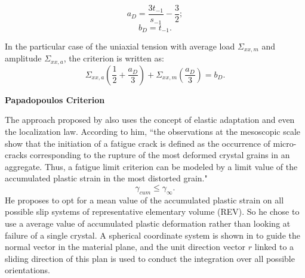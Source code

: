 $$a_D=\frac{3t_{-1}}{s_{-1}}-\frac{3}{2};$$  $$b_D=t_{-1}.$$

In the particular case of the uniaxial tension with average load $\Sigma_{xx,m}$ and amplitude $\Sigma_{xx,a}$, the criterion is written as:
$$\Sigma_{xx,a}\left(\dfrac{1}{2}+\dfrac{a_D}{3} \right)+\Sigma_{xx,m}\left(\dfrac{a_D}{3} \right) =b_D.$$

\vspace{6pt}
\textbf{Papadopoulos Criterion}
\vspace{6pt}

The approach proposed by \cite{papadopoulos1993fatigue} also uses the concept of elastic adaptation and even the localization law. According to him, ``the observations at the mesoscopic scale show that the initiation of a fatigue crack is
defined as the occurrence of micro-cracks corresponding to the rupture of the most deformed crystal grains in an
aggregate. Thus, a fatigue limit criterion can be modeled by a limit value of the accumulated plastic strain in the
most distorted grain."
$$\gamma_{cum}\leqslant\gamma_\infty.$$
He proposes to opt for a mean value of the accumulated plastic strain on all possible slip systems of representative elementary volume (REV). So he chose to use a average value  of accumulated plastic deformation rather than looking at failure of a single crystal. A spherical coordinate system is shown in  to guide the normal vector in the material plane, and the unit direction vector $r$ linked to a sliding direction of this plan is used to conduct the integration over all possible orientations.

